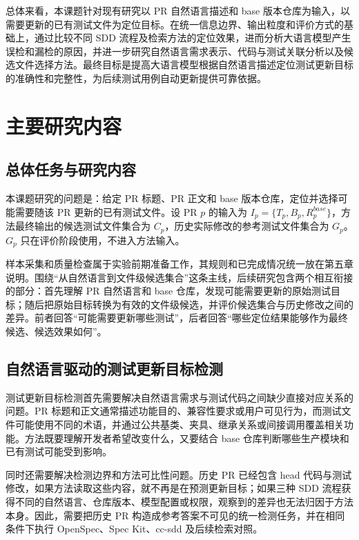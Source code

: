 总体来看，本课题针对现有研究以 PR 自然语言描述和 base 版本仓库为输入，以需要更新的已有测试文件为定位目标。在统一信息边界、输出粒度和评价方式的基础上，通过比较不同 SDD 流程及检索方法的定位效果，进而分析大语言模型产生误检和漏检的原因，并进一步研究自然语言需求表示、代码与测试关联分析以及候选文件选择方法。最终目标是提高大语言模型根据自然语言描述定位测试更新目标的准确性和完整性，为后续测试用例自动更新提供可靠依据。

\section{主要研究内容}

\subsection{总体任务与研究内容}

本课题研究的问题是：给定 PR 标题、PR 正文和 base 版本仓库，定位并选择可能需要随该 PR 更新的已有测试文件。设 PR $p$ 的输入为 $I_p=\{T_p,B_p,R_p^{base}\}$，方法最终输出的候选测试文件集合为 $C_p$，历史实际修改的参考测试文件集合为 $G_p$。$G_p$ 只在评价阶段使用，不进入方法输入。

样本采集和质量检查属于实验前期准备工作，其规则和已完成情况统一放在第五章说明。围绕“从自然语言到文件级候选集合”这条主线，后续研究包含两个相互衔接的部分：首先理解 PR 自然语言和 base 仓库，发现可能需要更新的原始测试目标；随后把原始目标转换为有效的文件级候选，并评价候选集合与历史修改之间的差异。前者回答“可能需要更新哪些测试”，后者回答“哪些定位结果能够作为最终候选、候选效果如何”。

\subsection{自然语言驱动的测试更新目标检测}



测试更新目标检测首先需要解决自然语言需求与测试代码之间缺少直接对应关系的问题。PR 标题和正文通常描述功能目的、兼容性要求或用户可见行为，而测试文件可能使用不同的术语，并通过公共基类、夹具、继承关系或间接调用覆盖相关功能。方法既要理解开发者希望改变什么，又要结合 base 仓库判断哪些生产模块和已有测试可能受到影响。

同时还需要解决检测边界和方法可比性问题。历史 PR 已经包含 head 代码与测试修改，如果方法读取这些内容，就不再是在预测更新目标；如果三种 SDD 流程获得不同的自然语言、仓库版本、模型配置或权限，观察到的差异也无法归因于方法本身。因此，需要把历史 PR 构造成参考答案不可见的统一检测任务，并在相同条件下执行 OpenSpec、Spec Kit、cc-sdd 及后续检索对照。



